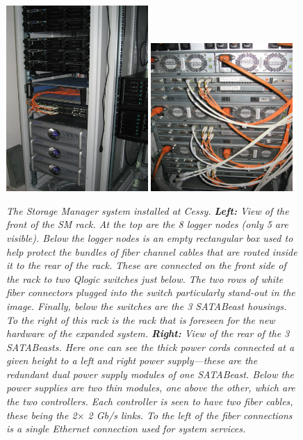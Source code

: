 \begin{figure}[tb]
\begin{center}  
\includegraphics[width=0.48\textwidth]{Hardware/frontSM_img_1385}
\includegraphics[width=0.48\textwidth]{Hardware/backSMsatacontroller_img_1389}
\caption{\emph{ The Storage Manager system installed at Cessy.
{\bf Left:} View of the front of the SM rack. At the top are the 8 logger nodes 
(only 5 are visible). 
Below the logger nodes  is an empty rectangular box used to help protect 
the bundles of fiber channel cables that are routed inside it to the rear of the rack.
These are connected on the front side of the rack to two Qlogic switches just below. 
The two rows of white fiber connectors  plugged into the switch 
particularly stand-out in the image.
Finally, below the switches are the 3 SATABeast housings.
To the right of this rack is the rack that is foreseen for the new hardware of the expanded system.
{\bf Right:} View of the rear of the 3 SATABeasts. Here one  can see the thick power cords
connected at a given height to a left and right power supply---these are the redundant dual power supply
modules of one SATABeast.
Below the power supplies are two thin modules, one above the other, which are the two controllers.
Each controller is seen to have two fiber cables, these being the 2$\times$ 2 Gb/s links.
To the left of the fiber connections is a single Ethernet connection used for system services.
}}
\label{fig:SMpics}
\end{center}
\end{figure}   




